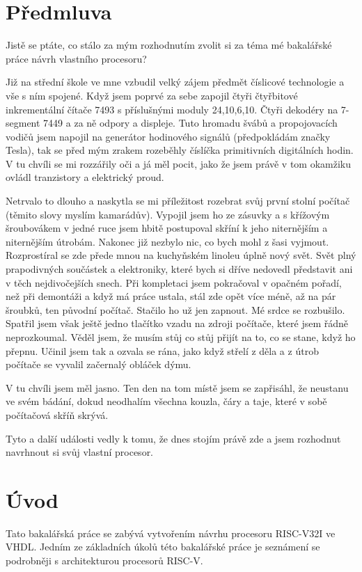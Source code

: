 \documentclass[FM,BP]{tulthesis}
\begin{document}
\chapter{Předmluva}
Jistě se ptáte, co stálo za mým rozhodnutím zvolit si za téma mé bakalářské práce návrh vlastního procesoru?

Již na střední škole ve mne vzbudil velký zájem předmět číslicové technologie a vše s ním spojené. Když jsem poprvé za sebe zapojil čtyři čtyřbitové inkrementální čítače 7493 \cite{wiki_7400} s příslušnými moduly 24,10,6,10. Čtyři dekodéry na 7-segment 7449 a za ně odpory a displeje. Tuto hromadu švábů a propojovacích vodičů jsem napojil na generátor hodinového signálů (předpokládám značky Tesla), tak se před mým zrakem rozeběhly číslíčka primitivních digitálních hodin. V tu chvíli se mi rozzářily oči a já měl pocit, jako že jsem právě v tom okamžiku ovládl tranzistory a elektrický proud.

Netrvalo to dlouho a naskytla se mi příležitost rozebrat svůj první stolní počítač (těmito slovy myslím kamarádův). Vypojil jsem ho ze zásuvky a s křížovým šroubovákem v jedné ruce jsem hbitě postupoval skříní k jeho niternějším a niternějším útrobám. Nakonec již nezbylo nic, co bych mohl z šasi vyjmout. Rozprostíral se zde přede mnou na kuchyňském linoleu úplně nový svět. Svět plný prapodivných součástek a elektroniky, které bych si dříve nedovedl představit ani v těch nejdivočejších snech. Při kompletaci jsem pokračoval v opačném pořadí, než při demontáži a když má práce ustala, stál zde opět více méně, až na pár šroubků, ten původní počítač. Stačilo ho už jen zapnout. Mé srdce se rozbušilo. Spatřil jsem však ještě jedno tlačítko vzadu na zdroji počítače, které jsem řádně neprozkoumal. Věděl jsem, že musím stůj co stůj přijít na to, co se stane, když ho přepnu. Učinil jsem tak a ozvala se rána, jako když střelí z děla a z útrob počítače se vyvalil začernalý obláček dýmu. 

V tu chvíli jsem měl jasno. Ten den na tom místě jsem se zapřisáhl, že neustanu ve svém bádání, dokud neodhalím všechna kouzla, čáry a taje, které v sobě počítačová skříň skrývá. 

Tyto a další události vedly k tomu, že dnes stojím právě zde a jsem rozhodnut navrhnout si svůj vlastní procesor. 

\chapter{Úvod}
Tato bakalářská práce se zabývá vytvořením návrhu procesoru RISC-V32I ve VHDL. Jedním ze základních úkolů této bakalářské práce je seznámení se podrobněji s architekturou procesorů RISC-V. 
\end{document}
